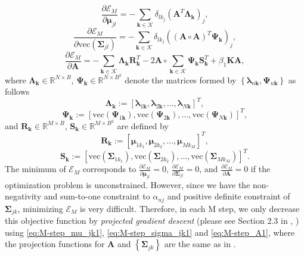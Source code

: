 \documentclass[twocolumn,english]{IEEEtran}
\theoremstyle{plain}
\begin{document}
\begin{equation}
\frac{\partial\mathcal{E}_{M}}{\partial\boldsymbol{\mu}_{jl}}=-\sum_{\mathbf{k}\in\mathcal{K}}\delta_{lk_{j}}\left(\mathbf{A}^{T}\boldsymbol{\Lambda}_{\mathbf{k}}\right)_{j},\label{eq:M-step_mu_jk1}
\end{equation}
\begin{equation}
\frac{\partial\mathcal{E}_{M}}{\partial\text{vec}\left(\boldsymbol{\Sigma}_{jl}\right)}=-\sum_{\mathbf{k}\in\mathcal{K}}\delta_{lk_{j}}\left(\left(\mathbf{A}\circ\mathbf{A}\right)^{T}\boldsymbol{\Psi}_{\mathbf{k}}\right)_{j},\label{eq:M-step_sigma_jk1}
\end{equation}
\begin{equation}
\frac{\partial\mathcal{E}_{M}}{\partial\mathbf{A}}=-\sum_{\mathbf{k}\in\mathcal{K}}\boldsymbol{\Lambda}_{\mathbf{k}}\mathbf{R}_{\mathbf{k}}^{T}-2\mathbf{A}\circ\sum_{\mathbf{k}\in\mathcal{K}}\boldsymbol{\Psi}_{\mathbf{k}}\mathbf{S}_{\mathbf{k}}^{T}+\beta_{1}\mathbf{K}\mathbf{A},\label{eq:M-step_A1}
\end{equation}
where $\boldsymbol{\Lambda}_{\mathbf{k}}\in\mathbb{R}^{N\times B}$,
$\boldsymbol{\Psi}_{\mathbf{k}}\in\mathbb{R}^{N\times B^{2}}$ denote
the matrices formed by $\left\{ \boldsymbol{\lambda}_{n\mathbf{k}},\boldsymbol{\Psi}_{n\mathbf{k}}\right\} $
as follows
\[
\boldsymbol{\Lambda}_{\mathbf{k}}:=\left[\boldsymbol{\lambda}_{1\mathbf{k}},\boldsymbol{\lambda}_{2\mathbf{k}},\dots,\boldsymbol{\lambda}_{N\mathbf{k}}\right]^{T},
\]
\[
\boldsymbol{\Psi}_{\mathbf{k}}:=\left[\text{vec}\left(\boldsymbol{\Psi}_{1\mathbf{k}}\right),\text{vec}\left(\boldsymbol{\Psi}_{2\mathbf{k}}\right),\dots,\text{vec}\left(\boldsymbol{\Psi}_{N\mathbf{k}}\right)\right]^{T},
\]
and $\mathbf{R}_{\mathbf{k}}\in\mathbb{R}^{M\times B}$, $\mathbf{S}_{\mathbf{k}}\in\mathbb{R}^{M\times B^{2}}$
are defined by 
\begin{equation}
\mathbf{R}_{\mathbf{k}}:=\left[\boldsymbol{\mu}_{1k_{1}},\boldsymbol{\mu}_{2k_{2}},\dots,\boldsymbol{\mu}_{Mk_{M}}\right]^{T},\label{eq:R_k}
\end{equation}
\begin{equation}
\mathbf{S}_{\mathbf{k}}:=\left[\text{vec}\left(\boldsymbol{\Sigma}_{1k_{1}}\right),\text{vec}\left(\boldsymbol{\Sigma}_{2k_{2}}\right),\dots,\text{vec}\left(\boldsymbol{\Sigma}_{Mk_{M}}\right)\right]^{T}.\label{eq:S_k}
\end{equation}
The minimum of $\mathcal{E}_{M}$ corresponds to $\frac{\partial\mathcal{E}_{M}}{\partial\boldsymbol{\mu}_{jl}}=0$,
$\frac{\partial\mathcal{E}_{M}}{\partial\boldsymbol{\Sigma}_{jl}}=0$,
and $\frac{\partial\mathcal{E}_{M}}{\partial\mathbf{A}}=0$ if the
optimization problem is unconstrained. However, since we have the
non-negativity and sum-to-one constraint to $\alpha_{nj}$ and positive
definite constraint of $\boldsymbol{\Sigma}_{jk}$, minimizing $\mathcal{E}_{M}$
is very difficult. Therefore, in each M step, we only decrease this
objective function by \emph{projected gradient descent} (please see
Section 2.3 in \cite{bertsekas1999nonlinear}, \cite{lin2007projected})
using \eqref{eq:M-step_mu_jk1}, \eqref{eq:M-step_sigma_jk1} and
\eqref{eq:M-step_A1}, where the projection functions for $\mathbf{A}$
and $\left\{ \boldsymbol{\Sigma}_{jk}\right\} $ are the same as in
\cite{zhou2016spatial}.
\end{document}
